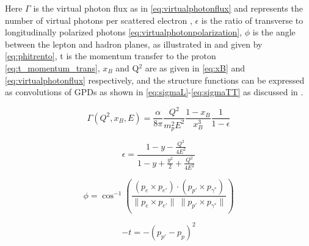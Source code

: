              Here $\Gamma$ is the virtual photon flux as in \eqref{eq:virtualphotonflux} and represents the number of virtual photons per scattered electron \parencite{Amaldi1979Pion-electroproduction}, $\epsilon$ is the ratio of transverse to longitudinally polarized photons \eqref{eq:virtualphotonpolarization}, $\phi$ is the angle between the lepton and hadron planes, as illustrated in  and given by \eqref{eq:phitrento}, t is the momentum transfer to the proton \eqref{eq:t_momentum_trans}, $x_B$ and Q$^2$ are as given in \eqref{eq:xB} and \eqref{eq:virtualphotonflux} respectively, and the structure functions can be expressed as convolutions of GPDs as shown in \eqref{eq:sigmaL}-\eqref{eq:sigmaTT} as discussed in \parencite{Bedlinskiy2014ExclusiveCLAS}. 
  
    
            \begin{equation}\label{eq:virtualphotonflux}
                         \Gamma (Q^2, x_B, E) = \frac{\alpha}{8\pi} \frac{Q^2}{m^2_pE^2}\frac{1-x_B}{x_B^3}\frac{1}{1-\epsilon}
            \end{equation}
        
            \begin{equation}\label{eq:virtualphotonpolarization}
                \epsilon = \frac{1 - y - \frac{Q^2}{4E^2}}{1 - y + \frac{y^2}{2} + \frac{Q^2}{4E^2}}
            \end{equation}

            \begin{equation}\label{eq:phitrento}
                \phi = \cos^{-1} \left( \frac{ \left(p_{e} \times p_{e'} \right) \cdot \left( p_{p'} \times p_{\gamma^*} \right) }{ \lVert p_{e} \times p_{e'} \rVert \: \lVert p_{p'} \times p_{\gamma^*} \rVert} \right)
            \end{equation}

            \begin{equation}\label{eq:t_momentum_trans}
                -t = -(p_{p'}-p_p)^2
            \end{equation}


